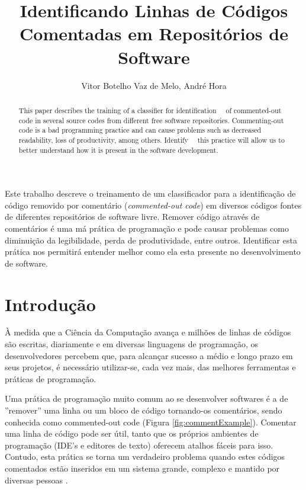 \documentclass[12pt]{article}
\title{Identificando Linhas de Códigos Comentadas em Repositórios de Software}
\author{Vitor Botelho Vaz de Melo\inst{1}, André Hora\inst{1} }
\begin{document}
 

\maketitle

\begin{abstract}
  This paper describes the training of a classifier for identification
  of commented-out code in several source codes from different free software 
  repositories. Commenting-out code is a bad programming practice and can cause 
  problems such as decreased readability, loss of productivity, among others. Identify
  this practice will allow us to better understand how it is present in the 
  software development.
\end{abstract}
     
\begin{resumo} 
  Este trabalho descreve o treinamento de um classificador para a identificação 
  de código removido por comentário (\textit{commented-out code}) em diversos 
  códigos fontes de diferentes repositórios de software livre. Remover código 
  através de comentários é uma má prática de programação e pode causar problemas 
  como diminuição da legibilidade, perda de produtividade, entre outros. Identificar
  esta prática nos permitirá entender melhor como ela esta presente no desenvolvimento
  de software.
\end{resumo}


\section{Introdução} \label{sec:intr}

À medida que a Ciência da Computação avança e milhões de linhas de códigos são 
escritas, diariamente e em diversas linguagens de programação, os desenvolvedores 
percebem que, para alcançar sucesso a médio e longo prazo em seus projetos, é
necessário utilizar-se, cada vez mais, das melhores ferramentas e práticas de 
programação. 

Uma prática de programação muito comum ao se desenvolver softwares é a de 
''remover'' uma linha ou um bloco de código tornando-os comentários, sendo conhecida  
como commented-out code (Figura \ref{fig:commentExample}). Comentar uma linha de código 
pode ser útil, tanto que 
os próprios ambientes de programação (IDE's e editores de texto) oferecem atalhos 
fáceis para isso. Contudo, esta prática se torna um verdadeiro problema quando 
estes códigos comentados estão inseridos em um sistema grande, complexo e
mantido por diversas pessoas \cite{cleanCode}.
\end{document}
